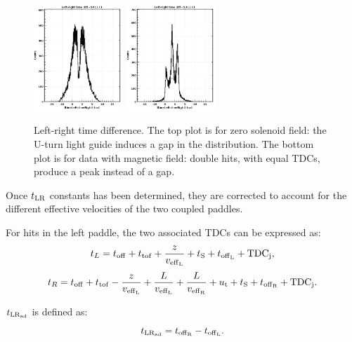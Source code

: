 \begin{figure}[htb]
\begin{center}
\includegraphics[width=0.3\textwidth]{Figure/nofield.png} 
\includegraphics[width=0.3\textwidth]{Figure/field.png} 
\end{center}
\caption{Left-right time difference. The top plot is for zero solenoid field: the U-turn light guide induces a gap in the distribution. The bottom plot is for data with magnetic field: double hits, with equal TDCs, produce a peak instead of a gap.}
\label{LR}
\end{figure}
%
Once $t_{\rm{LR}}$ constants has been determined, they are corrected to account for the different effective velocities of the two coupled paddles.

For hits in the left paddle, the two associated TDCs can be expressed as:
\begin{equation}\label{time_of_hits}
t_L=t_{\rm{off}}+t_{\rm{tof}}+\frac{z}{v_{\rm{eff}_L}}+t_{\rm{S}}+t_{\rm{off}_{\rm{L}}}+{\rm{TDC}}_{\rm{j}},
\end{equation}
\begin{equation}
t_R=t_{\rm{off}}+t_{\rm{tof}}-\frac{z}{v_{\rm{eff}_L}}+\frac{L}{v_{\rm{eff}_L}}+\frac{L}{v_{\rm{eff}_{\rm{R}}}}+u_{\rm{t}}+t_{\rm{S}}+t_{\rm{off}_{\rm{R}}}+{\rm{TDC}}_{\rm{j}}.
\end{equation}

$t_{\rm{LR}_{\rm{ad}}}$ is defined as:
\begin{equation}
t_{\rm{LR}_{\rm{ad}}}=t_{\rm{off}_{\rm{R}}}-t_{\rm{off}_{\rm{L}}}.
\end{equation}

